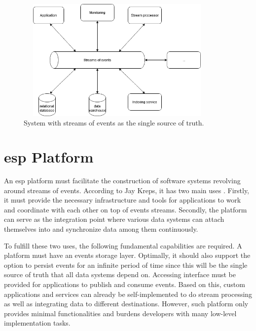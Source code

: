 \begin{figure}[h]
	\centering
	\includegraphics[width=10cm,height=6cm]{images/eventstreamprocessing.png}
	\caption{System with streams of events as the single source of truth.}
	\label{fig:eventstreamprocessingsystem}
\end{figure}




\section{\acrlong{esp} Platform}
An \acrshort{esp} platform must facilitate the construction of software systems revolving around streams of events. According to Jay Kreps, it has two main uses \cite{eventstreamingplatform}. Firstly, it must provide the necessary infrastructure and tools for applications to work and coordinate with each other on top of events streams. Secondly, the platform can serve as the integration point where various data systems can attach themselves into and synchronize data among them continuously.

To fulfill these two uses, the following fundamental capabilities are required. A platform must have an events storage layer. Optimally, it should also support the option to persist events for an infinite period of time since this will be the single source of truth that all data systems depend on. Accessing interface must be provided for applications to publish and consume events. Based on this, custom applications and services can already be self-implemented to do stream processing as well as integrating data to different destinations. However, such platform only provides minimal functionalities and burdens developers with many low-level implementation tasks.

